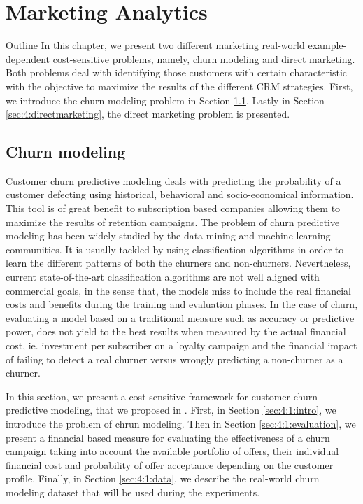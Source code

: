 \chapter{Marketing Analytics}

\begin{remark}{Outline}
In this chapter, we present two different marketing real-world example-dependent 
cost-sensitive problems, namely, churn modeling and direct marketing. Both problems deal 
with identifying those customers with certain characteristic with the objective to maximize the 
results of the different CRM strategies.
First, we introduce the churn modeling problem in Section \ref{sec:4:churn}. Lastly in Section 
\ref{sec:4:directmarketing}, the direct marketing problem is presented.
\end{remark}


\section{Churn modeling}
\label{sec:4:churn}

Customer churn predictive modeling deals with predicting the probability of a customer defecting 
using historical, behavioral and socio-economical information. This tool is of great benefit to 
subscription based companies allowing them to maximize the results of retention campaigns. The 
problem of churn predictive modeling has been widely studied by the data mining and machine learning
communities. It is usually tackled by using classification algorithms in order to learn the 
different patterns of both the churners and non-churners. Nevertheless, current state-of-the-art 
classification algorithms are not well aligned with commercial goals, in the sense that, the models 
miss to include the real financial costs and benefits during the training and evaluation phases. In 
the case of churn, evaluating a model based on a traditional measure such as accuracy or predictive 
power, does not yield to the best results when measured by the actual financial cost, ie. 
investment per subscriber on a loyalty campaign and the financial impact of failing to detect a 
real churner versus wrongly predicting a non-churner as a churner.

In this section, we present a cost-sensitive framework for customer churn predictive modeling, 
that we proposed in \citep{CorreaBahnsen2015a}. First, in Section \ref{sec:4:1:intro}, we introduce 
the problem of chrun modeling. Then in Section \ref{sec:4:1:evaluation}, we present a financial 
based measure for evaluating the effectiveness of a churn campaign taking into account the available 
portfolio of offers, their individual financial cost and probability of offer acceptance depending 
on the customer profile. Finally, in Section \ref{sec:4:1:data}, we describe the real-world churn 
modeling dataset that will be used during the experiments.



